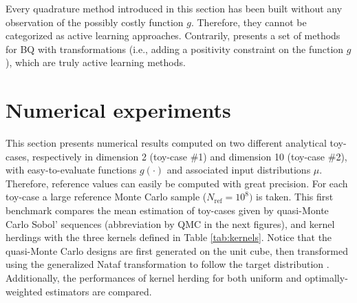 \medskip
\begin{remark}
Every quadrature method introduced in this section has been built without any observation of the possibly costly function $g$. 
Therefore, they cannot be categorized as active learning approaches. 
Contrarily, \cite{motonobu_2019} presents a set of methods for BQ with transformations (i.e., adding a positivity constraint on the function $g$), which are truly active learning methods. 
\end{remark}




\section{Numerical experiments}\label{sec4}

This section presents numerical results computed on two different analytical toy-cases, respectively in dimension 2 (toy-case \#1) and dimension 10 (toy-case \#2), with easy-to-evaluate functions $g(\cdot)$ and associated input distributions $\mu$. 
Therefore, reference values can easily be computed with great precision. 
For each toy-case a large reference Monte Carlo sample ($N_{\mathrm{ref}} = 10^8)$ is taken. 
This first benchmark compares the mean estimation of toy-cases given by quasi-Monte Carlo Sobol' sequences (abbreviation by QMC in the next figures), and kernel herdings with the three kernels defined in Table \ref{tab:kernels}. 
Notice that the quasi-Monte Carlo designs are first generated on the unit cube, then transformed using the generalized Nataf transformation to follow the target distribution \citep{lebrun_2009}. 
Additionally, the performances of kernel herding for both uniform and optimally-weighted  estimators are compared. 

